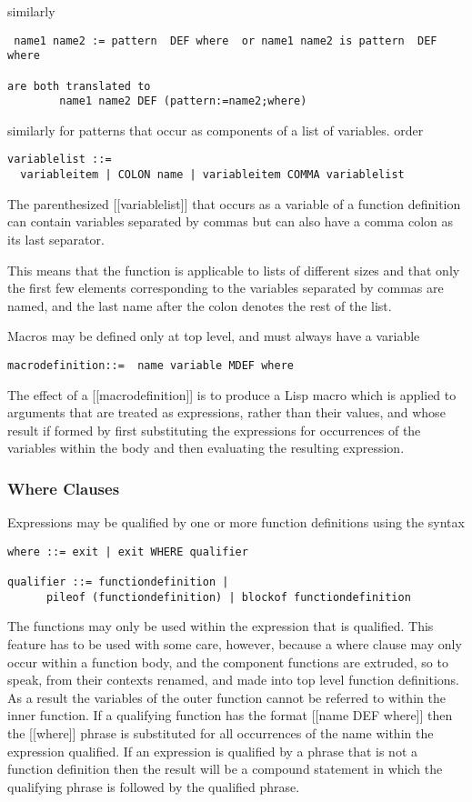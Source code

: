 \documentclass{article}
\begin{document}
similarly
\begin{verbatim}
 name1 name2 := pattern  DEF where  or name1 name2 is pattern  DEF where

are both translated to
        name1 name2 DEF (pattern:=name2;where)
\end{verbatim}

similarly for patterns that occur as components of a list of
variables. order
\begin{verbatim}
variablelist ::=
  variableitem | COLON name | variableitem COMMA variablelist
\end{verbatim}

The parenthesized [[variablelist]] that occurs as a variable of a function
definition can contain variables separated by commas but can also
have a comma colon as its last separator.

This means that the function is applicable to lists of different
sizes and that only the first few elements corresponding to the
variables separated by commas are named, and
the last name after the colon denotes the rest of the list.

Macros may be defined only at top level, and must always have a variable
\begin{verbatim}
macrodefinition::=  name variable MDEF where
\end{verbatim}

The effect of a [[macrodefinition]] is to produce a Lisp macro
which is applied to arguments that are treated as expressions, rather
than their values, and whose result if formed by first substituting
the expressions for occurrences of the variables within the body
and then evaluating the resulting expression.

\subsubsection{Where Clauses}
\label{sec:boot:where-clause}

Expressions may be qualified by one or more function definitions
using the syntax
\begin{verbatim}
where ::= exit | exit WHERE qualifier

qualifier ::= functiondefinition |
      pileof (functiondefinition) | blockof functiondefinition
\end{verbatim}

The functions may only be used within the expression that is qualified.
This feature has to be used with some care, however, because
a where clause may only occur within a function body, and
the component functions are extruded, so to speak, from their contexts
renamed, and made into top level function definitions.
As a result the variables of the outer function cannot be referred to
within the inner function.
If a qualifying function has the format [[name DEF where]] then
the [[where]] phrase is substituted for all occurrences of the name
within the expression qualified.
If an expression is qualified by a phrase that is not a
function definition then the result will be a compound statement
in which the qualifying phrase is followed by the qualified phrase.
\end{document}
